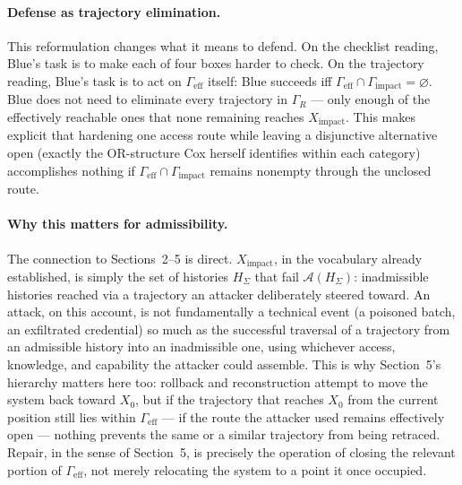 \documentclass[11pt]{article}
\begin{document}
\paragraph{Defense as trajectory elimination.} This reformulation changes what it means to defend. On the checklist reading, Blue's task is to make each of four boxes harder to check. On the trajectory reading, Blue's task is to act on $\Gamma_{\mathrm{eff}}$ itself: Blue succeeds iff $\Gamma_{\mathrm{eff}} \cap \Gamma_{\mathrm{impact}} = \varnothing$. Blue does not need to eliminate every trajectory in $\Gamma_R$ --- only enough of the effectively reachable ones that none remaining reaches $X_{\mathrm{impact}}$. This makes explicit that hardening one access route while leaving a disjunctive alternative open (exactly the OR-structure Cox herself identifies within each category) accomplishes nothing if $\Gamma_{\mathrm{eff}} \cap \Gamma_{\mathrm{impact}}$ remains nonempty through the unclosed route.

\paragraph{Why this matters for admissibility.} The connection to Sections~2--5 is direct. $X_{\mathrm{impact}}$, in the vocabulary already established, is simply the set of histories $H_\Sigma$ that fail $\mathcal{A}(H_\Sigma)$: inadmissible histories reached via a trajectory an attacker deliberately steered toward. An attack, on this account, is not fundamentally a technical event (a poisoned batch, an exfiltrated credential) so much as the successful traversal of a trajectory from an admissible history into an inadmissible one, using whichever access, knowledge, and capability the attacker could assemble. This is why Section~5's hierarchy matters here too: rollback and reconstruction attempt to move the system back toward $X_0$, but if the trajectory that reaches $X_0$ from the current position still lies within $\Gamma_{\mathrm{eff}}$ --- if the route the attacker used remains effectively open --- nothing prevents the same or a similar trajectory from being retraced. Repair, in the sense of Section~5, is precisely the operation of closing the relevant portion of $\Gamma_{\mathrm{eff}}$, not merely relocating the system to a point it once occupied.
\end{document}

